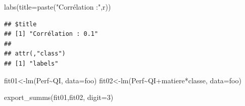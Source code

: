 \documentclass[
]{book}
\newenvironment{Shaded}{\begin{snugshade}}{\end{snugshade}}
\newcommand{\AttributeTok}[1]{\textcolor[rgb]{0.77,0.63,0.00}{#1}}
\newcommand{\DecValTok}[1]{\textcolor[rgb]{0.00,0.00,0.81}{#1}}
\newcommand{\FunctionTok}[1]{\textcolor[rgb]{0.00,0.00,0.00}{#1}}
\newcommand{\NormalTok}[1]{#1}
\newcommand{\OtherTok}[1]{\textcolor[rgb]{0.56,0.35,0.01}{#1}}
\newcommand{\SpecialCharTok}[1]{\textcolor[rgb]{0.00,0.00,0.00}{#1}}
\newcommand{\StringTok}[1]{\textcolor[rgb]{0.31,0.60,0.02}{#1}}
\begin{document}
\begin{Shaded}
\begin{Highlighting}[]
  \FunctionTok{labs}\NormalTok{(}\AttributeTok{title=}\FunctionTok{paste}\NormalTok{(}\StringTok{"Corrélation :"}\NormalTok{,r))}
\end{Highlighting}
\end{Shaded}

\begin{verbatim}
## $title
## [1] "Corrélation : 0.1"
## 
## attr(,"class")
## [1] "labels"
\end{verbatim}

\begin{Shaded}
\begin{Highlighting}[]
\NormalTok{fit01}\OtherTok{\textless{}{-}}\FunctionTok{lm}\NormalTok{(Perf}\SpecialCharTok{\textasciitilde{}}\NormalTok{QI, }\AttributeTok{data=}\NormalTok{foo)}
\NormalTok{fit02}\OtherTok{\textless{}{-}}\FunctionTok{lm}\NormalTok{(Perf}\SpecialCharTok{\textasciitilde{}}\NormalTok{QI}\SpecialCharTok{+}\NormalTok{matiere}\SpecialCharTok{*}\NormalTok{classe, }\AttributeTok{data=}\NormalTok{foo)}

\FunctionTok{export\_summs}\NormalTok{(fit01,fit02, }\AttributeTok{digit=}\DecValTok{3}\NormalTok{)}
\end{Highlighting}
\end{Shaded}

 
  \providecommand{\huxb}[2]{\arrayrulecolor[RGB]{#1}\global\arrayrulewidth=#2pt}
  \providecommand{\huxvb}[2]{\color[RGB]{#1}\vrule width #2pt}
  \providecommand{\huxtpad}[1]{\rule{0pt}{#1}}
  \providecommand{\huxbpad}[1]{\rule[-#1]{0pt}{#1}}
\end{document}
